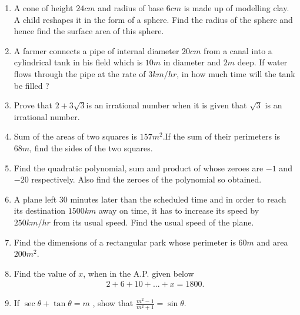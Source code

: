 \documentclass[12pt,-letter paper]{article}
\begin{document}
\begin{enumerate}
\item A cone of height $24 cm$ and radius of base $6 cm$ is made up of modelling clay. A child reshapes it in the form of a sphere. Find the radius of the sphere and hence find the surface area of this sphere.

\item A farmer connects a pipe of internal diameter $20 cm$ from a canal into a cylindrical tank in his field which is $10 m$ in diameter and $2 m$ deep. If water flows through the pipe at the rate of $3 km/hr$, in how much time will the tank be filled ?

\item Prove that $2 + 3\sqrt{3}$is an irrational number when it is given that $\sqrt{3}$ is an irrational number.

\item Sum of the areas of two squares is $157 m^2$.If the sum of their perimeters is $68 m$, find the sides of the two squares.

\item Find the quadratic polynomial, sum and product of whose zeroes are $-1$ and $-20$ respectively. Also find the zeroes of the polynomial so obtained.

\item A plane left $30$ minutes later than the scheduled time and in order to reach its destination $1500 km$ away on time, it has to increase its speed by $250 km/hr$ from its usual speed. Find the usual speed of the plane.

\item Find the dimensions of a rectangular park whose perimeter is $60 m$ and area $200 m^2$.

\item Find the value of $x$, when in the A.P. given below
\begin{align*}
2 + 6 + 10 + ... + x = 1800.    
\end{align*}

\item If $\sec\theta + \tan\theta=m$ , show that $\frac{m^2-1}{m^2+1} = \sin\theta$.


\end{enumerate}
\end{document}
